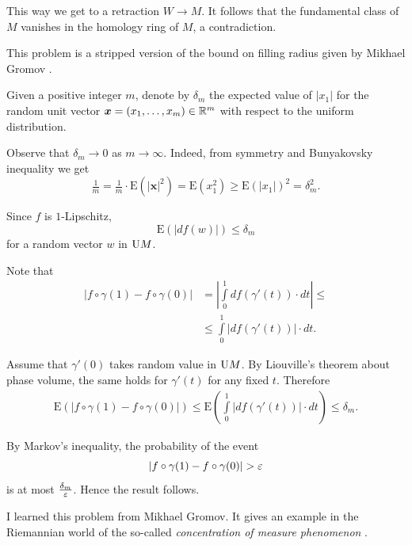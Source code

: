 This way we get 
to a retraction $W\to M$.
It follows that the fundamental class of $M$ vanishes in the homology ring of $M$, 
a contradiction. 
\qeds


This problem is a stripped version of the bound on filling radius given by Mikhael Gromov \cite{gromov-filling}.  

Given a positive integer $m$,
denote by $\delta_m$ 
the expected value of $|x_1|$ for the random unit vector 
$\bm{x}\z=(x_1,\dots,x_m)\z\in\RR^m$ 
with respect to the uniform distribution.

Observe that $\delta_m\to 0$ as $m\to\infty$.
Indeed, from symmetry and Bunyakovsky inequality we get
\[
\tfrac1m=\tfrac1m\cdot\mathrm{E}(|\bm{x}|^2)
=\mathrm{E}(x_1^2)\ge \mathrm{E}(|x_1|)^2=\delta_m^2.
\]

Since $f$ is $1$-Lipschitz,
\[\mathrm{E}(|df(w)|)\le\delta_m\]
for a random vector $w$ in $\mathrm{U} M$.


Note that 
\begin{align*}
|f\circ \gamma(1)-f\circ\gamma(0)|
&=
\left|\int\limits_0^1df(\gamma'(t))\cdot dt\right|\le \\
&\le \int\limits_0^1\left|df(\gamma'(t))\right|\cdot dt.
\end{align*}

Assume that $\gamma'(0)$
takes random value in $\mathrm{U} M$.
By Liouville's theorem about phase volume, the same holds for $\gamma'(t)$
for any fixed $t$.
Therefore
\begin{align*}
\mathrm{E}(|f\circ \gamma(1)-f\circ\gamma(0)|)\le \mathrm{E}\left(\int\limits_0^1|df(\gamma'(t))|\cdot dt\right)\le\delta_m.
\end{align*}

By Markov's inequality,
the probability of the event 
\[|f\circ \gamma(1)-f\circ\gamma(0)|>\eps\]
is at most $\tfrac{\delta_m}{\varepsilon}$.
Hence the result follows.
\qeds

I learned this problem from Mikhael Gromov.
It gives an example in the Riemannian world
of the so-called 
\emph{concentration of measure phenomenon}
\cite{milman-schechtman,ledoux}.
